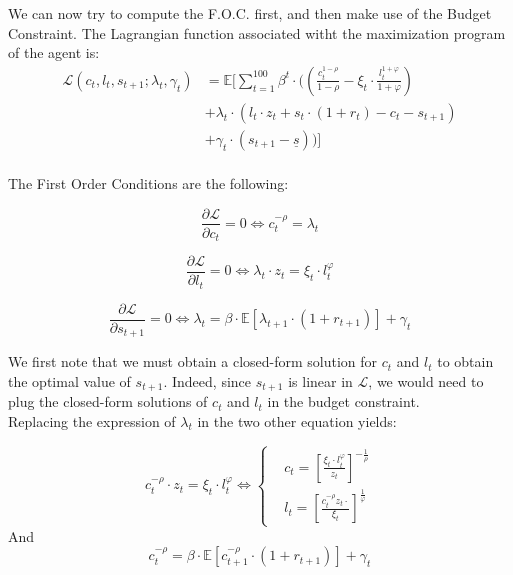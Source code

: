 \documentclass{article}
\begin{document}
We can now try to compute the F.O.C. first, and then make use of the Budget Constraint.
The Lagrangian function associated witht the maximization program of the agent is: 
\begin{equation}
    \begin{split}
        \mathcal{L}(c_{t},l_{t},s_{t+1};\lambda_t,\gamma_{t}) &
        = \mathbb{E}\Big[\sum_{t=1}^{100} \beta^{t}\cdot ((\frac{c_{t}^{1-\rho}}{1-\rho}-\xi_{t}\cdot\frac{l_{t}^{1+\varphi}}{1+\varphi}) \\
        & +\lambda_{t}\cdot \left(l_{t}\cdot z_{t}+s_{t}\cdot (1+r_{t})-c_{t}-s_{t+1}\right) \\ 
        & + \gamma_{t}\cdot \left(s_{t+1}-\underline{s}\right))\Big] \\ 
    \end{split}
\end{equation}

The First Order Conditions are the following:

$$\frac{\partial \mathcal{L}}{\partial c_{t}} = 0 \iff c_{t}^{-\rho} = \lambda_{t}$$


$$\frac{\partial \mathcal{L}}{\partial l_{t}} = 0 \iff \lambda_{t}\cdot z_{t} = \xi_{t}\cdot l_{t}^{\varphi}$$


$$\frac{\partial \mathcal{L}}{\partial s_{t+1}} = 0 \iff \lambda_{t} = \beta \cdot \mathbb{E}\left[\lambda_{t+1}\cdot (1+r_{t+1})\right] + \gamma_{t}$$

We first note that we must obtain a closed-form solution for $c_{t}$ and $l_{t}$ to obtain 
the optimal value of $s_{t+1}$. 
Indeed, since $s_{t+1}$ is linear in $\mathcal{L}$, we would need to plug the closed-form
solutions of $c_{t}$ and $l_{t}$ in the budget constraint. \\

Replacing the expression of $\lambda_{t}$ in the two other equation yields: 

\begin{equation}
    c^{-\rho}_{t}\cdot z_{t} = \xi_{t}\cdot l_{t}^{\varphi} \iff
        \begin{cases}
        & c_t = \left[\frac{\xi_{t}\cdot l_{t}^{\varphi}}{z_{t}}\right]^{-\frac{1}{\rho}}\\ 
        & l_{t} = \left[\frac{c_{t}^{-\rho}z_{t}\cdot}{\xi_{t}}\right]^{\frac{1}{\varphi}}
    \end{cases}
\end{equation}
And 
\begin{equation}
    c^{-\rho}_{t} = \beta \cdot \mathbb{E}\left[c^{-\rho}_{t+1}\cdot (1+r_{t+1})\right] + \gamma_{t}
\end{equation}
\end{document}
